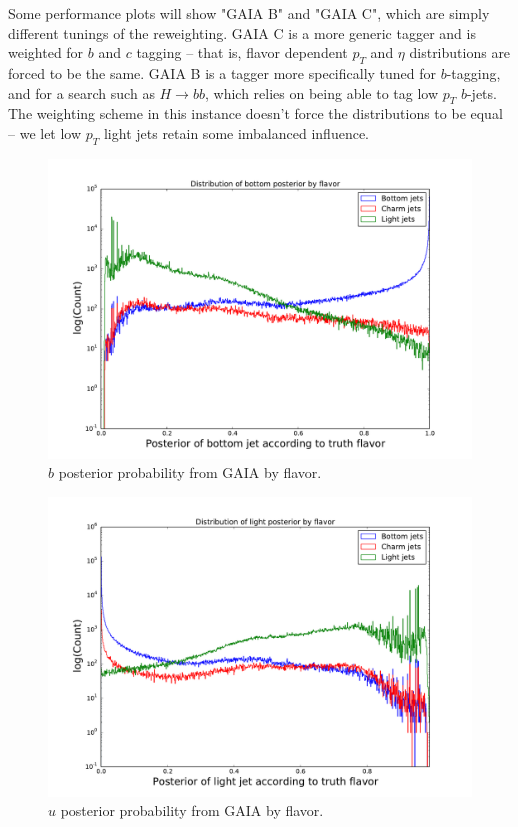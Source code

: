 Some performance plots will show "GAIA B" and "GAIA C", which are simply different tunings of the reweighting. GAIA C is a more generic tagger and is weighted for $b$ and $c$ tagging -- that is, flavor dependent $p_T$ and $\eta$ distributions are forced to be the same. GAIA B is a tagger more specifically tuned for $b$-tagging, and for a search such as $H\longrightarrow bb$, which relies on being able to tag low $p_T$ $b$-jets. The weighting scheme in this instance doesn't force the distributions to be equal -- we let low $p_T$ light jets retain some imbalanced influence.

\begin{figure}[h]
\includegraphics[width=\textwidth]{figures/unweight_bottom_p_distro}
\caption[The ATLAS detector]{$b$ posterior probability from GAIA by flavor.
\label{fig:bpost}}
\end{figure}

\begin{figure}[h]
\includegraphics[width=\textwidth]{figures/light_p_distro}
\caption[The ATLAS detector]{$u$ posterior probability from GAIA by flavor.
\label{fig:upost}}
\end{figure}

